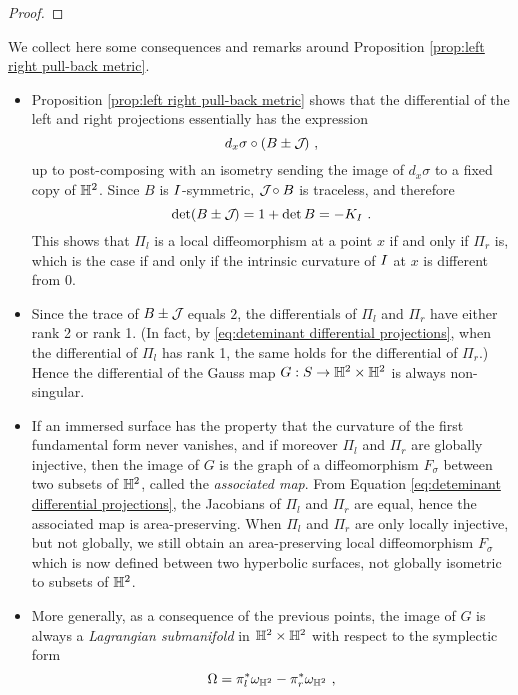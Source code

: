 \begin{proof}
\end{proof}
We collect here some consequences and remarks around Proposition \ref{prop:left right pull-back metric}.
\begin{itemize}[leftmargin=0.5cm]
\item Proposition \ref{prop:left right pull-back metric} shows that the differential of the left and right projections essentially has the expression 
\[
    d_x\sigma\circ(B\pm\mathcal{J}\!)~,
\]
up to post-composing with an isometry sending the image of $d_x\sigma$ to a fixed copy of $\mathbb{H}^2$. Since $B$ is $I$-symmetric, $\mathcal{J}\!\circ B$ is traceless, and therefore 
\begin{equation}\label{eq:deteminant differential projections}
\det(B\pm\mathcal{J}\!)=1+\det B=-K_I~.
\end{equation}
This shows that $\Pi_l$ is a local diffeomorphism at a point $x$ if and only if $\Pi_r$ is, which is the case if and only if the intrinsic curvature of $I$ at $x$ is different from $0$.
\item Since the trace of $B\pm\mathcal{J}\!$ equals $2$, the differentials of $\Pi_l$ and $\Pi_r$ have either rank 2 or rank 1. (In fact, by \eqref{eq:deteminant differential projections}, when the differential of $\Pi_l$ has rank 1, the same holds for the differential of $\Pi_r$.) Hence the differential of the Gauss map $G:S\to\mathbb{H}^2\times\mathbb{H}^2$ is always non-singular.
\item If an immersed surface has the property that the curvature of the first fundamental form never vanishes, and if moreover $\Pi_l$ and $\Pi_r$ are globally injective, then the image of $G$ is the graph of a  diffeomorphism $F_\sigma$ between two subsets of $\mathbb{H}^2$,  called the \emph{associated map}. From Equation \eqref{eq:deteminant differential projections}, the Jacobians of $\Pi_l$ and $\Pi_r$ are equal, hence the associated map is area-preserving.
When $\Pi_l$ and $\Pi_r$ are only locally injective, but not globally, we still obtain an area-preserving local diffeomorphism $F_\sigma$ which is now defined between two hyperbolic surfaces, not globally isometric to subsets of $\mathbb{H}^2$.
\item More generally, as a consequence of the previous points, the image of $G$ is always a \emph{Lagrangian submanifold} in $\mathbb{H}^2\times\mathbb{H}^2$ with respect to the symplectic form 
\begin{equation} \label{eq symplectic form}
\Omega=\pi_l^*\omega_{\mathbb{H}^2}-\pi_r^*\omega_{\mathbb{H}^2}~,
\end{equation}

\end{itemize}
